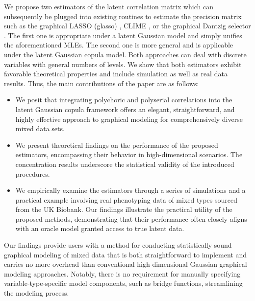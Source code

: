 We propose two estimators of the latent correlation matrix which can subsequently be plugged into existing routines to estimate the precision matrix such as the graphical LASSO (glasso) \citep{Friedman08}, CLIME \citep{Cai11}, or the graphical Dantzig selector \citep{Yuan10}. The first one is appropriate under a latent Gaussian model and simply unifies the aforementioned MLEs. The second one is more general and is applicable under the latent Gaussian copula model. Both approaches can deal with discrete variables with general numbers of levels.
We show that both estimators exhibit favorable theoretical properties and include simulation as well as real data results. Thus, the main contributions of the paper are as follows:
\begin{itemize}
\item We posit that integrating polychoric and polyserial correlations into the latent Gaussian copula framework offers an elegant, straightforward, and highly effective approach to graphical modeling for comprehensively diverse mixed data sets.
\item We present theoretical findings on the performance of the proposed estimators, encompassing their behavior in high-dimensional scenarios. The concentration results underscore the statistical validity of the introduced procedures.
\item We empirically examine the estimators through a series of simulations and a practical example involving real phenotyping data of mixed types sourced from the UK Biobank. Our findings illustrate the practical utility of the proposed methods, demonstrating that their performance often closely aligns with an oracle model granted access to true latent data.
\end{itemize}

Our findings provide users with a method for conducting statistically sound graphical modeling of mixed data that is both straightforward to implement and carries no more overhead than conventional high-dimensional Gaussian graphical modeling approaches. Notably, there is no requirement for manually specifying variable-type-specific model components, such as bridge functions, streamlining the modeling process.

